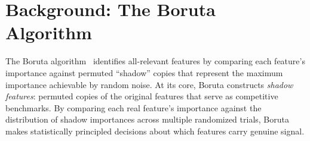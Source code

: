 \documentclass[runningheads]{llncs}
\newcommand{\writeme}[1]{\todo[inline,color=yellow!40]{WRITE: #1}}
\newcommand{\addcite}[1]{\todo[inline,color=blue!20]{CITE: #1}}
\begin{document}

\section{Background: The Boruta Algorithm}
\label{sec:background}


The Boruta algorithm~\cite{kursa2010feature} identifies all-relevant features by comparing each feature's importance against permuted ``shadow'' copies that represent the maximum importance achievable by random noise. At its core, Boruta constructs \emph{shadow features}: permuted copies of the original features that serve as competitive benchmarks. By comparing each real feature's importance against the distribution of shadow importances across multiple randomized trials, Boruta makes statistically principled decisions about which features carry genuine signal.

\end{document}
